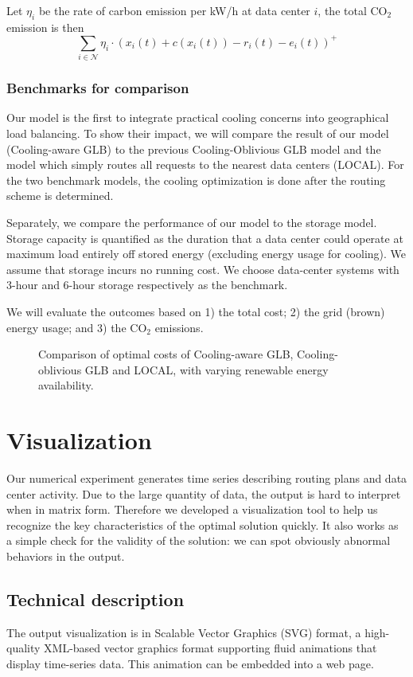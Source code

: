 \documentclass{acm_proc_article-sp}
\newcommand{\carbondioxide}{\ensuremath{\mathrm{CO}_2}}
\begin{document}
Let $\eta_i$ be the rate of carbon emission per kW/h at data center $i$, the total \carbondioxide{} emission is then
$$\sum_{i \in \mathcal{N}} \eta_i \cdot (x_i(t) + c(x_i(t)) - r_i(t) - e_i(t))^+$$
\subsubsection{Benchmarks for comparison}
Our model is the first to integrate practical cooling concerns into geographical load balancing. To show their impact, we will compare the result of our model (Cooling-aware GLB) to the previous Cooling-Oblivious GLB model and the model which simply routes all requests to the nearest data centers (LOCAL). For the two benchmark models, the cooling optimization is done after the routing scheme is determined.

Separately, we compare the performance of our model to the storage model. Storage capacity is quantified as the duration that a data center could operate at maximum load entirely off stored energy (excluding energy usage for cooling). We assume that storage incurs no running cost. We choose data-center systems with 3-hour and 6-hour storage respectively as the benchmark.

We will evaluate the outcomes based on 1) the total cost; 2) the grid (brown) energy usage; and 3) the \carbondioxide{} emissions.

\begin{figure*}
\centering
{}
\caption{Comparison of optimal costs of Cooling-aware GLB, Cooling-oblivious GLB and LOCAL, with varying renewable energy availability.}
\end{figure*}
\section{Visualization}
Our numerical experiment generates time series describing routing plans and data center activity. Due to the large quantity of data, the output is hard to interpret when in matrix form. Therefore we developed a visualization tool to help us recognize the key characteristics of the optimal solution quickly. It also works as a simple check for the validity of the solution: we can spot obviously abnormal behaviors in the output.

\subsection{Technical description}
The output visualization is in Scalable Vector Graphics (SVG) format, a high-quality XML-based vector graphics format supporting fluid animations that display time-series data. This animation can be embedded into a web page.
\end{document}
